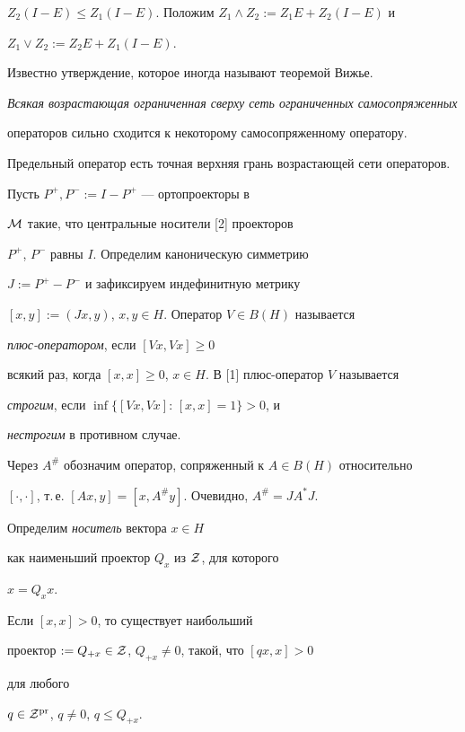 $Z_{2}(I-E)\leq Z_{1}(I-E)$. Положим $Z_{1}\wedge Z_{2}:=Z_{1}E+Z_{2}(I-E)$ и


$Z_{1}\vee Z_{2}:=Z_{2}E+Z_{1}(I-E)$.





Известно утверждение, которое иногда называют теоремой Вижье.


{\it Всякая возрастающая ограниченная сверху сеть ограниченных самосопряженных 


операторов сильно сходится к некоторому самосопряженному оператору. 


Предельный оператор есть точная верхняя грань возрастающей сети операторов.} 





Пусть $P^{+}, P^{-}:=I-P^{+}$ --- ортопроекторы в


$\cal M$ такие, что центральные носители [2] проекторов


$P^{+}$, $P^{-}$ равны $I$. Определим каноническую симметрию


$J:=P^{+}-P^{-}$ и зафиксируем индефинитную метрику


$[x,y]:=(Jx,y)$, $x, y\in H$. Оператор $V\in B(H)$ называется 


{\it плюс-оператором}, если $[Vx,Vx]\geq 0$ 


всякий раз, когда $[x,x]\geq 0$, $x\in H$. В [1] плюс-оператор $V$ называется 


{\it строгим}, если $\inf\{[Vx,Vx]:\,[x,x]=1\}>0$, и 


{\it нестрогим} в противном случае. 


Через $A^{\#}$ обозначим оператор, сопряженный к $A\in B(H)$ относительно 


$[\cdot,\cdot]$, т.\,е. $[Ax,y]=[x,A^{\#}y]$. Очевидно, $A^{\#}=JA^{*}J$. 


Определим {\it носитель} вектора $x\in H$


как наименьший проектор $Q_{x}$ из ${\cal Z}$, для которого


$x=Q_{x}x$.





\begin{lem}


Если $[x,x]>0$, то существует наибольший


проектор $:=Q_{+x}\in {\cal Z}$, $Q_{+x}\ne0$, такой, что $[qx,x]>0$


для любого


$q\in {\cal Z}^{\operatorname{pr}}$, $q\ne0$, $q\leq Q_{+x}$.


\end{lem}





